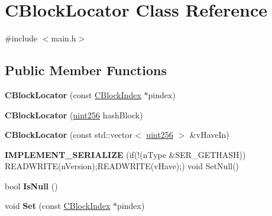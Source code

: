 \hypertarget{class_c_block_locator}{}\section{C\+Block\+Locator Class Reference}
\label{class_c_block_locator}


{\ttfamily \#include $<$main.\+h$>$}

\subsection*{Public Member Functions}
\begin{DoxyCompactItemize}
\item 
\mbox{\label{class_c_block_locator_a2f30e0b3334f1cb98c7b3079a89743c9}} 
{\bfseries C\+Block\+Locator} (const \mbox{\hyperlink{class_c_block_index}{C\+Block\+Index}} $\ast$pindex)
\item 
\mbox{\label{class_c_block_locator_a16d49c0f443cbe9023de4a1b66af9574}} 
{\bfseries C\+Block\+Locator} (\mbox{\hyperlink{classuint256}{uint256}} hash\+Block)
\item 
\mbox{\label{class_c_block_locator_a12bd4c9c6f4fc9892e2c1f4c8e083226}} 
{\bfseries C\+Block\+Locator} (const std\+::vector$<$ \mbox{\hyperlink{classuint256}{uint256}} $>$ \&v\+Have\+In)
\item 
\mbox{\label{class_c_block_locator_adaac4031fa0ca735f555050b02cda674}} 
{\bfseries I\+M\+P\+L\+E\+M\+E\+N\+T\+\_\+\+S\+E\+R\+I\+A\+L\+I\+ZE} (if(!(n\+Type \&S\+E\+R\+\_\+\+G\+E\+T\+H\+A\+SH)) R\+E\+A\+D\+W\+R\+I\+TE(n\+Version);R\+E\+A\+D\+W\+R\+I\+TE(v\+Have);) void Set\+Null()
\item 
\mbox{\label{class_c_block_locator_aa34a6e267a83b4e5b514275f6392ca22}} 
bool {\bfseries Is\+Null} ()
\item 
\mbox{\label{class_c_block_locator_abe0917322a7d29a0e080402694237a7b}} 
void {\bfseries Set} (const \mbox{\hyperlink{class_c_block_index}{C\+Block\+Index}} $\ast$pindex)
\item 
\mbox{\label{class_c_block_locator_a7106e425b977d437b21b18e765665879}} 

\end{DoxyCompactItemize}
